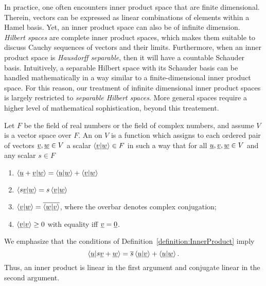 In practice, one often encounters inner product space that are finite dimensional.
Therein, vectors can be expressed as linear combinations of elements within a Hamel basis. 
Yet, an inner product space can also be of infinite dimension.
\emph{Hilbert spaces} are complete inner product spaces, which makes them suitable to discuss Cauchy sequences of vectors and their limits.
Furthermore, when an inner product space is \emph{Hausdorff separable}, then it will have a countable Schauder basis.
Intuitively, a separable Hilbert space with its Schauder basis can be handled mathematically in a way similar to a finite-dimensional inner product space.
For this reason, our treatment of infinite dimensional inner product spaces is largely restricted to \emph{separable Hilbert spaces}.
More general spaces require a higher level of mathematical sophistication, beyond this treatement.

\begin{definition} \label{definition:InnerProduct}
Let $F$ be the field of real numbers or the field of complex numbers, and assume $V$ is a vector space over $F$.
An  on $V$ is a function which assigns to each ordered pair of vectors $\underline{v}, \underline{w} \in V$ a scalar $\left\langle \underline{v} | \underline{w} \right\rangle \in F$ in such a way that for all $\underline{u}, \underline{v}, \underline{w} \in V$ and any scalar $s \in F$
\begin{enumerate}
\item $\left\langle \underline{u} + \underline{v} | \underline{w} \right\rangle
= \left\langle \underline{u} | \underline{w} \right\rangle
+ \left\langle \underline{v} | \underline{w} \right\rangle$
\item $\left\langle s \underline{v} | \underline{w} \right\rangle
= s \left\langle \underline{v} | \underline{w} \right\rangle$
\item $\left\langle \underline{v} | \underline{w} \right\rangle
= \overline{ \left\langle \underline{w} | \underline{v} \right\rangle }$, where the overbar denotes complex conjugation;
\item $\left\langle \underline{v} | \underline{v} \right\rangle \geq 0$ with equality iff $\underline{v} = \underline{0}$.
\end{enumerate}
\end{definition}

We emphasize that the conditions of Definition~\ref{definition:InnerProduct} imply
\begin{equation*}
\left\langle \underline{u} | s \underline{v} + \underline{w} \right\rangle
= \overline{s} \left\langle \underline{u} | \underline{v} \right\rangle
+ \left\langle \underline{u} | \underline{w} \right\rangle .
\end{equation*}
Thus, an inner product is linear in the first argument and conjugate linear in the second argument.

